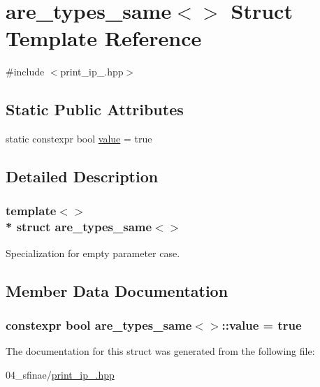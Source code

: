 \hypertarget{structare__types__same_3_4}{}\section{are\+\_\+types\+\_\+same$<$$>$ Struct Template Reference}
\label{structare__types__same_3_4}


{\ttfamily \#include $<$print\+\_\+ip\+\_.\+hpp$>$}

\subsection*{Static Public Attributes}
\begin{DoxyCompactItemize}
\item 
static constexpr bool \hyperlink{structare__types__same_3_4_a98ec5e4f4d6c655af0897cfd6778d3fa}{value} = true
\end{DoxyCompactItemize}


\subsection{Detailed Description}
\subsubsection*{template$<$$>$\\*
struct are\+\_\+types\+\_\+same$<$$>$}

Specialization for empty parameter case. 

\subsection{Member Data Documentation}
\subsubsection[{\texorpdfstring{value}{value}}]{\setlength{\rightskip}{0pt plus 5cm}constexpr bool {\bf are\+\_\+types\+\_\+same}$<$$>$\+::value = true\hspace{0.3cm}{\ttfamily [static]}}\hypertarget{structare__types__same_3_4_a98ec5e4f4d6c655af0897cfd6778d3fa}{}\label{structare__types__same_3_4_a98ec5e4f4d6c655af0897cfd6778d3fa}


The documentation for this struct was generated from the following file\+:\begin{DoxyCompactItemize}
\item 
04\+\_\+sfinae/\hyperlink{print__ip__04_8hpp}{print\+\_\+ip\+\_.\+hpp}\end{DoxyCompactItemize}
